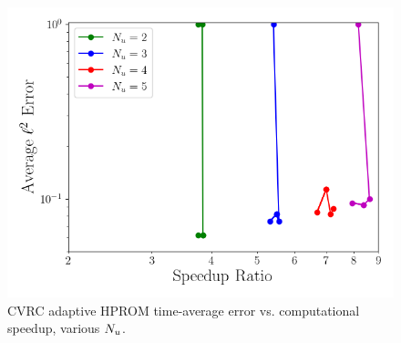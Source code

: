 \begin{figure}
    \centering
    \includegraphics[width=0.5\linewidth]{Chapters/AdaptiveResults/Images/cvrc/pareto_wrt_iters_Average_errorRaw_pareto.png}
    \caption{CVRC adaptive HPROM time-average error vs. computational speedup, various $N_u$.}
\end{figure}